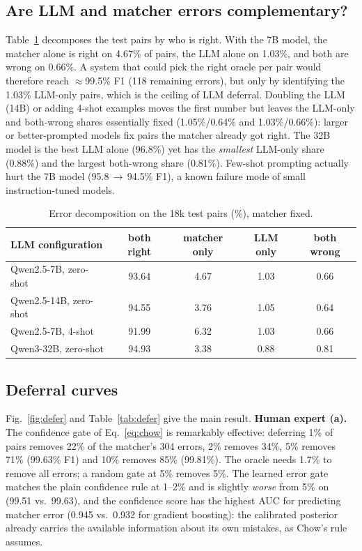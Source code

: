 \documentclass[conference]{IEEEtran}
\begin{document}
\subsection{Are LLM and matcher errors complementary?}
Table~\ref{tab:comp} decomposes the test pairs by who is right. With the 7B model, the matcher alone is right on 4.67\% of pairs, the LLM alone on 1.03\%, and both are wrong on 0.66\%. A system that could pick the right oracle per pair would therefore reach $\approx$99.5\% F1 (118 remaining errors), but only by identifying the 1.03\% LLM-only pairs, which is the ceiling of LLM deferral. Doubling the LLM (14B) or adding 4-shot examples moves the first number but leaves the LLM-only and both-wrong shares essentially fixed (1.05\%/0.64\% and 1.03\%/0.66\%): larger or better-prompted models fix pairs the matcher already got right. The 32B model is the best LLM alone (96.8\%) yet has the \emph{smallest} LLM-only share (0.88\%) and the largest both-wrong share (0.81\%). Few-shot prompting actually hurt the 7B model (95.8\,$\rightarrow$\,94.5\% F1), a known failure mode of small instruction-tuned models.

\begin{table}[t]
\caption{Error decomposition on the 18k test pairs (\%), matcher fixed.}
\label{tab:comp}
\centering\scriptsize\setlength{\tabcolsep}{3.5pt}
\begin{tabular}{@{}lcccc@{}}
\toprule
LLM configuration & both right & matcher only & LLM only & both wrong\\
\midrule
Qwen2.5-7B, zero-shot & 93.64 & 4.67 & 1.03 & 0.66\\
Qwen2.5-14B, zero-shot & 94.55 & 3.76 & 1.05 & 0.64\\
Qwen2.5-7B, 4-shot & 91.99 & 6.32 & 1.03 & 0.66\\
Qwen3-32B, zero-shot & 94.93 & 3.38 & 0.88 & 0.81\\
\bottomrule
\end{tabular}
\end{table}

\subsection{Deferral curves}
Fig.~\ref{fig:defer} and Table~\ref{tab:defer} give the main result. \textbf{Human expert (a).} The confidence gate of Eq.~\eqref{eq:chow} is remarkably effective: deferring 1\% of pairs removes 22\% of the matcher's 304 errors, 2\% removes 34\%, 5\% removes 71\% (99.63\% F1) and 10\% removes 85\% (99.81\%). The oracle needs 1.7\% to remove all errors; a random gate at 5\% removes 5\%. The learned error gate matches the plain confidence rule at 1--2\% and is slightly \emph{worse} from 5\% on (99.51 vs.\ 99.63), and the confidence score has the highest AUC for predicting matcher error (0.945 vs.\ 0.932 for gradient boosting): the calibrated posterior already carries the available information about its own mistakes, as Chow's rule assumes.
\end{document}
